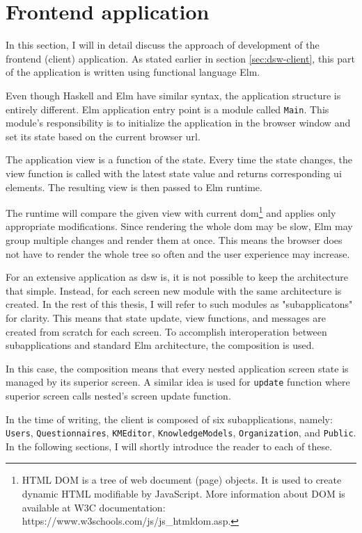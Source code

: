 \section{Frontend application}\label{sec:frontend-application}

In this section, I will in detail discuss the approach of development of the frontend (client) application.
As stated earlier in section \ref{sec:dsw-client}, this part of the application is written using functional language Elm.

Even though Haskell and Elm have similar syntax, the application structure is entirely different.
Elm application entry point is a module called \texttt{Main}.
This module's responsibility is to initialize the application in the browser window and set its state based on the current browser \gls{url}.

The application view is a function of the state.
Every time the state changes, the view function is called with the latest state value and returns corresponding \gls{ui} elements.
The resulting view is then passed to Elm runtime.

The runtime will compare the given view with current \gls{dom}\footnote{HTML DOM is a tree of web document (page) objects. It is used to create dynamic HTML modifiable by JavaScript. More information about DOM is available at W3C documentation: https://www.w3schools.com/js/js\_htmldom.asp.} and applies only appropriate modifications.
Since rendering the whole \gls{dom} may be slow\cite{accelebrate-slow-dom}, Elm may group multiple changes and render them at once.
This means the browser does not have to render the whole tree so often and the user experience may increase.

For an extensive application as \gls{dsw} is, it is not possible to keep the architecture that simple.
Instead, for each screen new module with the same architecture is created.
In the rest of this thesis, I will refer to such modules as "subapplicatons" for clarity.
This means that state update, view functions, and messages are created from scratch for each screen.
To accomplish interoperation between subapplications and standard Elm architecture, the composition is used.

In this case, the composition means that every nested application screen state is managed by its superior screen.
A similar idea is used for \texttt{update} function where superior screen calls nested's screen update function.

In the time of writing, the client is composed of six subapplications, namely: \texttt{Users}, \texttt{Questionnaires}, \texttt{KMEditor}, \texttt{KnowledgeModels}, \texttt{Organization}, and \texttt{Public}.
In the following sections, I will shortly introduce the reader to each of these.

